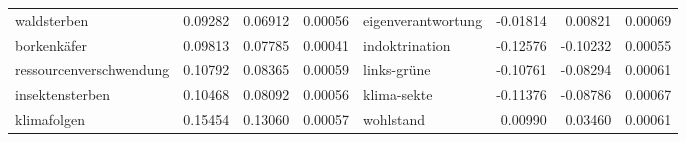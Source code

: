 \begin{table}
\begin{tabular}[t]{lrr>{}rlrrr}
waldsterben & 0.09282 & 0.06912 & 0.00056 & eigenverantwortung & -0.01814 & 0.00821 & 0.00069\\
borkenkäfer & 0.09813 & 0.07785 & 0.00041 & indoktrination & -0.12576 & -0.10232 & 0.00055\\
ressourcenverschwendung & 0.10792 & 0.08365 & 0.00059 & links-grüne & -0.10761 & -0.08294 & 0.00061\\
\addlinespace
insektensterben & 0.10468 & 0.08092 & 0.00056 & klima-sekte & -0.11376 & -0.08786 & 0.00067\\
klimafolgen & 0.15454 & 0.13060 & 0.00057 & wohlstand & 0.00990 & 0.03460 & 0.00061\\
\bottomrule
\end{tabular}
\end{table}